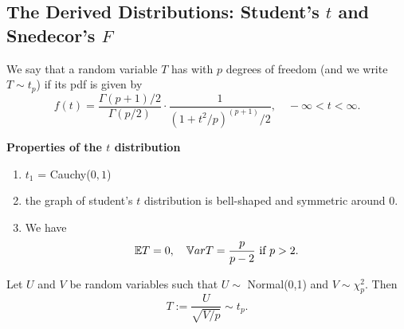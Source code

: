 \subsection{The Derived Distributions: Student’s $t$ and Snedecor’s $F$}
\begin{definition}
We say that a random variable $T$ has  with $p$ degrees of freedom (and we write $T \sim t_p$) if its pdf is given by
$$
f(t) = \frac{\Gamma(p+1)/2}{\Gamma(p/2)} \cdot
\frac{1}{(1+t^2/p)^(p+1)/2}, \quad -\infty < t < \infty.
$$
\end{definition}
\textbf{Properties of the $t$ distribution}
\begin{enumerate}
    \item $t_1$ = Cauchy($0,1$)
    \item the graph of student's $t$ distribution is bell-shaped and symmetric around 0.
    \item We have
    $$
    \mathbb E T = 0, \quad \mathbb V ar T = \frac{p}{p-2} \text{ if } p >2.
    $$
\end{enumerate}
Let $U$ and $V$ be random variables such that $U \sim $ Normal(0,1) and $V \sim \chi_p^2$. Then
$$
T := \frac{U}{\sqrt{V/p}} \sim t_p.
$$
